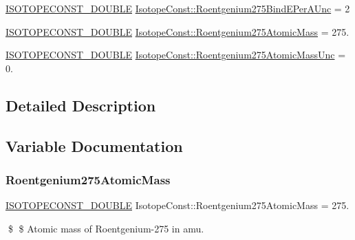 \begin{DoxyCompactItemize}
\item 
\mbox{\hyperlink{group___isotope_const-_macros_ga8f45a7272ce02c0b4c65c44636ed719a}{I\+S\+O\+T\+O\+P\+E\+C\+O\+N\+S\+T\+\_\+\+D\+O\+U\+B\+LE}} \mbox{\hyperlink{group___isotope_const-_roentgenium-_rg275_gad7e89159c6d63e52a0cea6fc2e6fd96b}{Isotope\+Const\+::\+Roentgenium275\+Bind\+E\+Per\+A\+Unc}} = 2
\item 
\mbox{\hyperlink{group___isotope_const-_macros_ga8f45a7272ce02c0b4c65c44636ed719a}{I\+S\+O\+T\+O\+P\+E\+C\+O\+N\+S\+T\+\_\+\+D\+O\+U\+B\+LE}} \mbox{\hyperlink{group___isotope_const-_roentgenium-_rg275_ga71f9953fa1f57934e7578d4af64ae1f8}{Isotope\+Const\+::\+Roentgenium275\+Atomic\+Mass}} = 275.
\item 
\mbox{\hyperlink{group___isotope_const-_macros_ga8f45a7272ce02c0b4c65c44636ed719a}{I\+S\+O\+T\+O\+P\+E\+C\+O\+N\+S\+T\+\_\+\+D\+O\+U\+B\+LE}} \mbox{\hyperlink{group___isotope_const-_roentgenium-_rg275_ga2ae76395b09cdc20289c33c010653455}{Isotope\+Const\+::\+Roentgenium275\+Atomic\+Mass\+Unc}} = 0.
\end{DoxyCompactItemize}


\subsection{Detailed Description}


\subsection{Variable Documentation}
\mbox{\label{group___isotope_const-_roentgenium-_rg275_ga71f9953fa1f57934e7578d4af64ae1f8}} 
\subsubsection{\texorpdfstring{Roentgenium275\+Atomic\+Mass}{Roentgenium275AtomicMass}}
{\footnotesize\ttfamily \mbox{\hyperlink{group___isotope_const-_macros_ga8f45a7272ce02c0b4c65c44636ed719a}{I\+S\+O\+T\+O\+P\+E\+C\+O\+N\+S\+T\+\_\+\+D\+O\+U\+B\+LE}} Isotope\+Const\+::\+Roentgenium275\+Atomic\+Mass = 275.}

\$ \$ Atomic mass of Roentgenium-\/275 in amu. \mbox{\label{group___isotope_const-_roentgenium-_rg275_ga2ae76395b09cdc20289c33c010653455}} 
